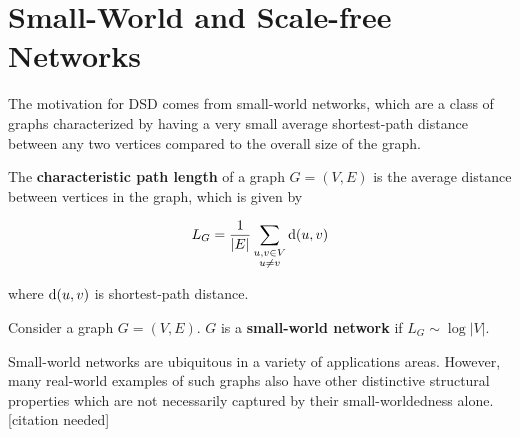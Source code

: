 






\section{Small-World and Scale-free Networks}

The motivation for DSD comes from small-world networks, which are a class of
graphs characterized by having a very small average shortest-path distance
between any two vertices compared to the overall size of the graph.


\begin{definition}
  The \textbf{characteristic path length} of a graph $G = (V,E)$ is the average
  distance between vertices in the graph, which is given by

  \[ L_G = \frac{1}{|E|} \sum_{\substack{u,v \in V \\ u \neq v}} \mathrm{d}(u,v)\]

  where $\mathrm{d}(u,v)$ is shortest-path distance. 
\end{definition}

\begin{definition}
  Consider a graph $G = (V,E)$. $G$ is a \textbf{small-world network} if
  $L_G \sim \log{|V|}$.
\end{definition}

Small-world networks are ubiquitous in a variety of applications areas. However,
many real-world examples of such graphs also have other distinctive structural
properties which are not necessarily captured by their small-worldedness alone.
[citation needed]




